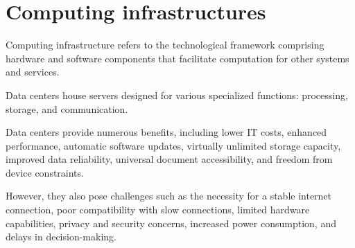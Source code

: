 \section{Computing infrastructures}

\begin{definition}
    Computing infrastructure refers to the technological framework comprising hardware and software components that facilitate computation for other systems and services.
\end{definition}
Data centers house servers designed for various specialized functions: processing, storage, and communication. 

Data centers provide numerous benefits, including lower IT costs, enhanced performance, automatic software updates, virtually unlimited storage capacity, improved data reliability, universal document accessibility, and freedom from device constraints.

However, they also pose challenges such as the necessity for a stable internet connection, poor compatibility with slow connections, limited hardware capabilities, privacy and security concerns, increased power consumption, and delays in decision-making.